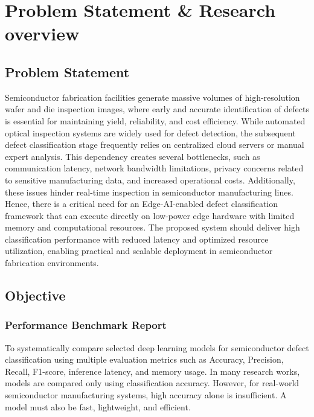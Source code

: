 \chapter{Problem Statement \& Research overview}

\section{Problem Statement}
Semiconductor fabrication facilities generate massive volumes of high-resolution wafer and die inspection images, where early and accurate identification of defects is essential for maintaining yield, reliability, and cost efficiency. While automated optical inspection systems are widely used for defect detection, the subsequent defect classification stage frequently relies on centralized cloud servers or manual expert analysis.
This dependency creates several bottlenecks, such as communication latency, network bandwidth limitations, privacy concerns related to sensitive manufacturing data, and increased operational costs. Additionally, these issues hinder real-time inspection in semiconductor manufacturing lines.
Hence, there is a critical need for an Edge-AI-enabled defect classification framework that can execute directly on low-power edge hardware with limited memory and computational resources. The proposed system should deliver high classification performance with reduced latency and optimized resource utilization, enabling practical and scalable deployment in semiconductor fabrication environments.

\section{Objective}
\subsection {Performance Benchmark Report}
To systematically compare selected deep learning models for semiconductor defect classification using multiple evaluation metrics such as Accuracy, Precision, Recall, F1-score, inference latency, and memory usage.
In many research works, models are compared only using classification accuracy. However, for real-world semiconductor manufacturing systems, high accuracy alone is insufficient. A model must also be fast, lightweight, and efficient.


